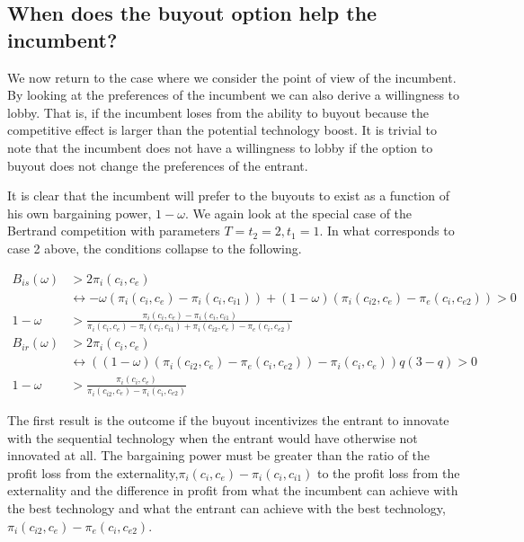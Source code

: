 \documentclass[11pt]{article}
\begin{document}
\subsection{When does the buyout option help the incumbent?}

We now return to the case where we consider the point of view of the incumbent. By looking at the preferences of the incumbent we can also derive a willingness to lobby. That is, if the incumbent loses from the ability to buyout because the competitive effect is larger than the potential technology boost. It is trivial to note that the incumbent does not have a willingness to lobby if the option to buyout does not change the preferences of the entrant. 

It is clear that the incumbent will prefer to the buyouts to exist as a function of his own bargaining power, $1-\omega$. We again look at the special case of the Bertrand competition with parameters $T=t_2=2,t_1=1$. In what corresponds to case 2 above, the conditions collapse to the following. 

\begin{align*}
B_{is}(\omega)&>2 \pi_i(c_i,c_e) \\
& \leftrightarrow -\omega(\pi_i(c_i,c_{e})- \pi_i(c_i,c_{i1})) 
+(1-\omega)(\pi_i(c_{i2},c_e)-\pi_e(c_{i},c_{e2})) >0 \\
1-\omega &> \frac{\pi_i(c_i,c_{e})- \pi_i(c_i,c_{i1})}{\pi_i(c_i,c_{e})- \pi_i(c_i,c_{i1})+\pi_i(c_{i2},c_e)-\pi_e(c_{i},c_{e2})}
\\
B_{ir}(\omega)&>2 \pi_i(c_i,c_e) \\
& \leftrightarrow ((1-\omega)(\pi_{i}(c_{i2},c_{e})-\pi_{e}(c_{i},c_{e2}))-\pi_i(c_i,c_e)) q(3-q)>0 \\
1-\omega&>\frac{\pi_i(c_i,c_e)}{\pi_i(c_{i2},c_e)-\pi_i(c_{i},c_{e2})}
\end{align*}

The first result is the outcome if the buyout incentivizes the entrant to innovate with the sequential technology when the entrant would have otherwise not innovated at all. The bargaining power must be greater than the ratio of the profit loss from the externality,$\pi_i(c_i,c_{e})- \pi_i(c_i,c_{i1})$ to the profit loss from the externality and the difference in profit from what the incumbent can achieve with the best technology and what the entrant can achieve with the best technology,$\pi_i(c_{i2},c_e)-\pi_e(c_{i},c_{e2})$. 
\end{document}

